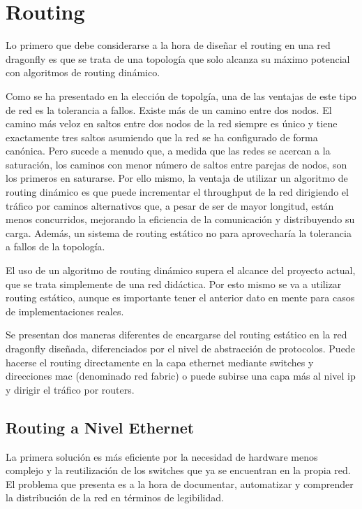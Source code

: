 \documentclass[%
    school=etsisi,%
    degree=61TI,%
]{upm-report}
\begin{document}
\section{Routing}
\label{sec:routing}

Lo primero que debe considerarse a la hora de diseñar el routing en una red dragonfly es que se trata de una topología que solo alcanza su máximo potencial con algoritmos de routing dinámico. 

Como se ha presentado en la elección de topolgía, una de las ventajas de este tipo de red es la tolerancia a fallos. Existe más de un camino entre dos nodos. El camino más veloz en saltos entre dos nodos de la red siempre es único y tiene exactamente tres saltos asumiendo que la red se ha configurado de forma canónica. Pero sucede a menudo que, a medida que las redes se acercan a la saturación, los caminos con menor número de saltos entre parejas de nodos, son los primeros en saturarse. Por ello mismo, la ventaja de utilizar un algoritmo de routing dinámico es que puede incrementar el throughput de la red dirigiendo el tráfico por caminos alternativos que, a pesar de ser de mayor longitud, están menos concurridos, mejorando la eficiencia de la comunicación y distribuyendo su carga. Además, un sistema de routing estático no para aprovecharía la tolerancia a fallos de la topología.

El uso de un algoritmo de routing dinámico supera el alcance del proyecto actual, que se trata simplemente de una red didáctica. Por esto mismo se va a utilizar routing estático, aunque es importante tener el anterior dato en mente para casos de implementaciones reales.

Se presentan dos maneras diferentes de encargarse del routing estático en la red dragonfly diseñada, diferenciados por el nivel de abstracción de protocolos. Puede hacerse el routing directamente en la capa ethernet mediante switches y direcciones mac (denominado red fabric) o puede subirse una capa más al nivel ip y dirigir el tráfico por routers.

\subsection{Routing a Nivel Ethernet}
\label{subsec:routing-nivel-ethernet}

La primera solución es más eficiente por la necesidad de hardware menos complejo y la reutilización de los switches que ya se encuentran en la propia red. El problema que presenta es a la hora de documentar, automatizar y comprender la distribución de la red en términos de legibilidad.
\end{document}
